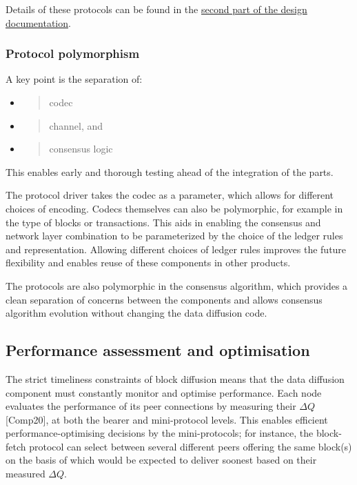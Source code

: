 \documentclass[11pt,a4paper]{article}
\begin{document}
Details of these protocols can be found in the
\href{https://hydra.iohk.io/build/1011577/download/1/network.pdf}{{second
part of the design documentation}}.

\subsubsection{Protocol polymorphism}
\label{protocol-polymorphism}

A key point is the separation of:

\begin{itemize}
\item
  \begin{quote}
  codec
  \end{quote}
\item
  \begin{quote}
  channel, and
  \end{quote}
\item
  \begin{quote}
  consensus logic
  \end{quote}
\end{itemize}

This enables early and thorough testing ahead of the integration of the
parts.

The protocol driver takes the codec as a parameter, which allows for
different choices of encoding. Codecs themselves can also be
polymorphic, for example in the type of blocks or transactions. This
aids in enabling the consensus and network layer combination to be
parameterized by the choice of the ledger rules and representation.
Allowing different choices of ledger rules improves the future
flexibility and enables reuse of these components in other products.

The protocols are also polymorphic in the consensus algorithm, which
provides a clean separation of concerns between the components and
allows consensus algorithm evolution without changing the data diffusion
code.

\subsection{Performance assessment and optimisation}
\label{performance-assessment-and-optimisation}

The strict timeliness constraints of block diffusion means that the data
diffusion component must constantly monitor and optimise performance.
Each node evaluates the performance of its peer connections by measuring
their $\Delta{}Q$ {[}Comp20{]}, at both the bearer and mini-protocol levels. This
enables efficient performance-optimising decisions by the
mini-protocols; for instance, the block-fetch protocol can select
between several different peers offering the same block(s) on the basis
of which would be expected to deliver soonest based on their measured
$\Delta{}Q$.
\end{document}

